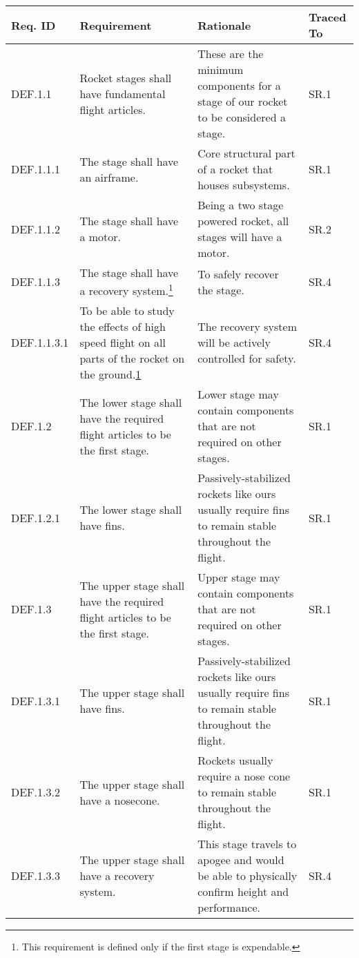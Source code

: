 \begin{table}[htbp] %
    \footnotesize 
    \setlength{\tymin}{40pt}
    \let\raggedright\RaggedRight
    
    \begin{tabulary}{\textwidth}{@{}LLLL@{}}
    \toprule
        \textbf{Req. ID} & \textbf{Requirement} & \textbf{Rationale} & \textbf{Traced To} \\
    \midrule
        DEF.1.1 & Rocket stages shall have fundamental flight articles. & These are the minimum components for a stage of our rocket to be considered a stage. & SR.1 \\
        DEF.1.1.1 & The stage shall have an airframe. & Core structural part of a rocket that houses subsystems. & SR.1 \\ 
        DEF.1.1.2 & The stage shall have a motor. & Being a two stage powered rocket, all stages will have a motor. & SR.2 \\
        DEF.1.1.3 & The stage shall have a recovery system.\footnote{\label{foot:s1-expend} This requirement is defined only if the first stage is expendable.} & To safely recover the stage. & SR.4 \\
        DEF.1.1.3.1 & To be able to study the effects of high speed flight on all parts of the rocket on the ground.\cref{foot:s1-expend} & The recovery system will be actively controlled for safety. & SR.4 \\
    \midrule
        DEF.1.2 & The lower stage shall have the required flight articles to be the first stage. & Lower stage may contain components that are not required on other stages. & SR.1 \\
        DEF.1.2.1 & The lower stage shall have fins. & Passively-stabilized rockets like ours usually require fins to remain stable throughout the flight. & SR.1 \\
    \midrule
        DEF.1.3 & The upper stage shall have the required flight articles to be the first stage. & Upper stage may contain components that are not required on other stages. & SR.1 \\
        DEF.1.3.1 & The upper stage shall have fins. & Passively-stabilized rockets like ours usually require fins to remain stable throughout the flight. & SR.1 \\
        DEF.1.3.2 & The upper stage shall have a nosecone. & Rockets usually require a nose cone to remain stable throughout the flight. & SR.1 \\
        DEF.1.3.3 & The upper stage shall have a recovery system. & This stage travels to apogee and would be able to physically confirm height and performance. & SR.4 \\

\end{tabulary}
\end{table}
